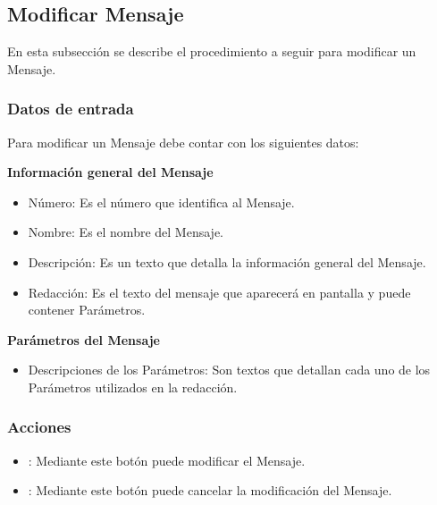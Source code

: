 \subsection{Modificar Mensaje}
En esta subsección se describe el procedimiento a seguir para modificar un Mensaje.

\subsubsection{Datos de entrada}
\begin{description}
	\item Para modificar un Mensaje debe contar con los siguientes datos: \hspace{10pt}
	\begin{description}
	    \item \textbf{Información general del Mensaje}
	    \begin{itemize}
		  \item Número: Es el número que identifica al Mensaje.
		  \item Nombre: Es el nombre del Mensaje.
		  \item Descripción: Es un texto que detalla la información general del Mensaje.
		  \item Redacción: Es el texto del mensaje que aparecerá en pantalla y puede contener Parámetros.
	    \end{itemize}
	    \item \textbf{Parámetros del Mensaje}    
	    \begin{itemize}
		  \item Descripciones de los Parámetros: Son textos que detallan cada uno de los Parámetros utilizados en la redacción.
	    \end{itemize}

	 \end{description}
\end{description}

\subsubsection{Acciones}
\begin{itemize}
 \item {}: Mediante este botón puede modificar el Mensaje.
 \item {}: Mediante este botón puede cancelar la modificación del Mensaje.
\end{itemize}
	
